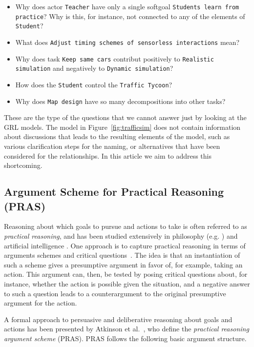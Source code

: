 \begin{itemize}
	\item Why does actor \texttt{Teacher} have only a single softgoal \texttt{Students learn from practice}? Why is this, for instance, not connected to any of the elements of \texttt{Student}?
	\item What does  \texttt{Adjust timing schemes of sensorless interactions} mean?
	\item Why does task \texttt{Keep same cars} contribut positively to \texttt{Realistic simulation} and negatively to \texttt{Dynamic simulation}?
	\item How does the \texttt{Student} control the \texttt{Traffic Tycoon}?
	\item Why does \texttt{Map design} have so many decompositions into other tasks?
\end{itemize}

These are the type of the questions that we cannot answer just by looking at the GRL models. The model in Figure~\ref{fig:trafficsim} does not contain information about discussions that leads to the resulting elements of the model, such as various clarification steps for the naming, or alternatives that have been considered for the relationships. In this article we aim to address this shortcoming.

\subsection{Argument Scheme for Practical Reasoning (PRAS)}
\label{sect:background:pras}

Reasoning about which goals to pursue and actions to take is often referred to as \emph{practical reasoning}, and has been studied extensively in philosophy (e.g. \cite{Raz1978-RAZPR,walton1990}) and artificial intelligence \cite{bratman1987,atkinson2007}. One approach is to capture practical reasoning in terms of arguments schemes and critical questions~\cite{walton1990}. The idea is that an instantiation of such a scheme gives a presumptive argument in favor of, for example, taking an action. This argument can, then, be tested by posing critical questions about, for instance, whether the action is possible given the situation, and a negative answer to such a question leads to a counterargument to the original presumptive argument for the action. 

A formal approach to persuasive and deliberative reasoning about goals and actions has been presented by Atkinson et al.~\cite{atkinson2007}, who define the \emph{practical reasoning argument scheme} (PRAS). PRAS follows the following basic argument structure. 

